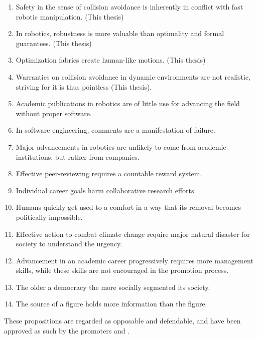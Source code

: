 \documentclass[nativefonts]{src/TUD-dissertation2020}
\begin{document}
\begin{enumerate}

  \item Safety in the sense of collision avoidance is inherently in conflict
    with fast robotic manipulation. (This thesis)
  \item In robotics, robustness is more valuable than optimality and formal
    guarantees. (This thesis)
  \item Optimization fabrics create human-like motions. (This thesis)
  \item Warranties on collision avoidance in dynamic environments are not
    realistic, striving for it is thus pointless (This thesis).
  \item Academic publications in robotics are of little use for advancing the
    field without proper software.
  \item In software engineering, comments are a manifestation of failure.
  \item Major advancements in robotics are unlikely to come from academic
    institutions, but rather from companies.
  \item Effective peer-reviewing requires a countable reward system.
  \item Individual career goals harm collaborative research efforts.
  \item Humans quickly get used to a comfort in a way that its removal becomes
    politically impossible.
  \item Effective action to combat climate change require major natural disaster
    for society to understand the urgency.
  \item Advancement in an academic career progressively requires more management
    skills, while these skills are not encouraged in the promotion process.
  \item The older a democracy the more socially segmented its society.
  \item The source of a figure holds more information than the figure.
\end{enumerate}

\bigskip
\bigskip

\begin{center}
These propositions are regarded as opposable and defendable, and have been
  approved as such by the promoters \promotor{} and \copromotor{}.
\end{center}

\clearpage
\end{document}
